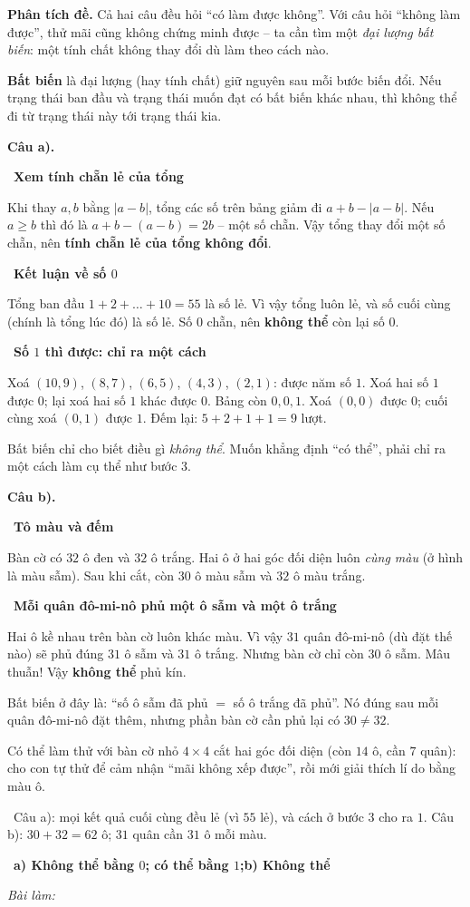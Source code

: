 \documentclass[11pt]{article}
\newif\ifsol \solfalse
\providecommand{\AnsWord}{Đáp số}
\newcommand{\StuProb}[2]{\begin{probboxS}{#1}{#2}\StuProbBody\end{probboxS}}
\newcommand{\ans}[1]{\par\smallskip{\bfseries\color{tmGreen!88!black}\AnsWord:}\ {\bfseries\color{AnsRed}#1}\par}
\newcommand{\probsol}[1]{%
  \begin{lrbox}{\solmeasure}\begin{minipage}{\dimexpr\linewidth-24pt\relax}#1\end{minipage}\end{lrbox}%
  \ifsol
    \begin{solbox}#1\end{solbox}%
  \else
    \setlength{\solht}{\dimexpr\ht\solmeasure+\dp\solmeasure+0.85cm\relax}%
    \ifdim\solht<1.35cm\setlength{\solht}{1.35cm}\fi
    \ifdim\solht>\StudentMaxWork\setlength{\solht}{\StudentMaxWork}\fi
    \par\noindent\begin{minipage}{\linewidth}%
    \expandafter\StuProb\StuProbArgs
    \begin{tcolorbox}[colback=white,colframe=Line,boxrule=0.8pt,arc=5pt,
      left=8pt,right=8pt,top=4pt,bottom=4pt,height=\solht]{\footnotesize\color{Slate}\itshape\WorkWord}\end{tcolorbox}%
    \end{minipage}\par\medskip
  \fi}
\newlength{\StudentMaxWork}\setlength{\StudentMaxWork}{4.5cm}
\newcommand{\step}[2]{\par\smallskip\noindent{\bfseries\color{tmBlue!85!black}\StepWord~#1.}\ {\bfseries #2}\par\nopagebreak}
\newcommand{\verify}[1]{\par\smallskip\noindent{\bfseries\color{tmGreen!80!black}\faCheckCircle\ \CheckWord}\ #1\par}
\def\WorkWord{Bài làm:}
\def\AnsWord{Đáp số}
\def\StepWord{Bước}
\def\CheckWord{Thử lại:}
\begin{document}
\probsol{
\textbf{Phân tích đề.} Cả hai câu đều hỏi ``có làm được không''. Với câu hỏi ``không làm được'', thử mãi cũng không chứng minh được --
ta cần tìm một \emph{đại lượng bất biến}: một tính chất không thay đổi dù làm theo cách nào.
\begin{recallbox}\textbf{Bất biến} là đại lượng (hay tính chất) giữ nguyên sau mỗi bước biến đổi. Nếu trạng thái ban đầu và trạng
thái muốn đạt có bất biến khác nhau, thì không thể đi từ trạng thái này tới trạng thái kia.\end{recallbox}
\par\smallskip\textbf{Câu a).}
\step{1}{Xem tính chẵn lẻ của tổng}
Khi thay $a, b$ bằng $|a - b|$, tổng các số trên bảng giảm đi $a + b - |a - b|$. Nếu $a \ge b$ thì đó là $a + b - (a - b) = 2b$ -- một
số chẵn. Vậy tổng thay đổi một số chẵn, nên \textbf{tính chẵn lẻ của tổng không đổi}.
\step{2}{Kết luận về số $0$}
Tổng ban đầu $1 + 2 + \dots + 10 = 55$ là số lẻ. Vì vậy tổng luôn lẻ, và số cuối cùng (chính là tổng lúc đó) là số lẻ. Số $0$ chẵn,
nên \textbf{không thể} còn lại số $0$.
\step{3}{Số $1$ thì được: chỉ ra một cách}
Xoá $(10, 9)$, $(8, 7)$, $(6, 5)$, $(4, 3)$, $(2, 1)$: được năm số $1$. Xoá hai số $1$ được $0$; lại xoá hai số $1$ khác được $0$.
Bảng còn $0, 0, 1$. Xoá $(0, 0)$ được $0$; cuối cùng xoá $(0, 1)$ được $1$. Đếm lại: $5 + 2 + 1 + 1 = 9$ lượt.
\begin{warnbox}Bất biến chỉ cho biết điều gì \emph{không thể}. Muốn khẳng định ``có thể'', phải chỉ ra một cách làm cụ thể như bước 3.
\end{warnbox}
\par\smallskip\textbf{Câu b).}
\step{4}{Tô màu và đếm}
Bàn cờ có $32$ ô đen và $32$ ô trắng. Hai ô ở hai góc đối diện luôn \emph{cùng màu} (ở hình là màu sẫm). Sau khi cắt, còn $30$ ô màu
sẫm và $32$ ô màu trắng.
\step{5}{Mỗi quân đô-mi-nô phủ một ô sẫm và một ô trắng}
Hai ô kề nhau trên bàn cờ luôn khác màu. Vì vậy $31$ quân đô-mi-nô (dù đặt thế nào) sẽ phủ đúng $31$ ô sẫm và $31$ ô trắng. Nhưng
bàn cờ chỉ còn $30$ ô sẫm. Mâu thuẫn! Vậy \textbf{không thể} phủ kín.
\begin{proofbox}Bất biến ở đây là: ``số ô sẫm đã phủ $=$ số ô trắng đã phủ''. Nó đúng sau mỗi quân đô-mi-nô đặt thêm, nhưng phần bàn
cờ cần phủ lại có $30 \ne 32$.\end{proofbox}
\begin{parentbox}Có thể làm thử với bàn cờ nhỏ $4\times 4$ cắt hai góc đối diện (còn $14$ ô, cần $7$ quân): cho con tự thử để cảm
nhận ``mãi không xếp được'', rồi mới giải thích lí do bằng màu ô.\end{parentbox}
\verify{Câu a): mọi kết quả cuối cùng đều lẻ (vì $55$ lẻ), và cách ở bước 3 cho ra $1$. Câu b): $30 + 32 = 62$ ô; $31$ quân cần $31$
ô mỗi màu.}
\ans{a) Không thể bằng $0$; có thể bằng $1$;\quad b) Không thể}
}
\end{document}

